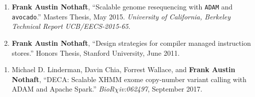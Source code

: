 \documentclass[10pt]{article} %
\newcounter{pubCtr}
\begin{document}
\begin {minipage}[t]{0.8\linewidth}
\begin{enumerate}
\setcounter{enumi}{\thepubCtr}
\item {\textbf{Frank Austin Nothaft}, ``Scalable genome resequencing with \texttt{ADAM} and \texttt{avocado}.''
Masters Thesis, May 2015. \emph{University of California, Berkeley Technical Report UCB/EECS-2015-65}.} 
\item {\textbf{Frank Austin Nothaft}, ``Design strategies for compiler managed instruction stores.''
Honors Thesis, Stanford University, June 2011.}
\setcounter{pubCtr}{\theenumi}
\end{enumerate}


\begin{enumerate}
\setcounter{enumi}{\thepubCtr}
\item {Michael D. Linderman, Davin Chia, Forrest Wallace, and \textbf{Frank Austin Nothaft}, ``DECA:
Scalable XHMM exome copy-number variant calling with ADAM and Apache Spark.''
\emph{BioR$\chi$iv:062497}, September 2017.}
\end{enumerate}
  
\noindent{}
\end {minipage}

\begin {minipage}[t]{0.2\linewidth}
\vspace{0pt}
\end {minipage}
\begin {minipage}[t]{0.8\linewidth}
\vspace{0pt}

 \\
 \\
 \\
 \\
 \\
 \\
 \\

 \\
 \\

\end {minipage}
\end{document}
